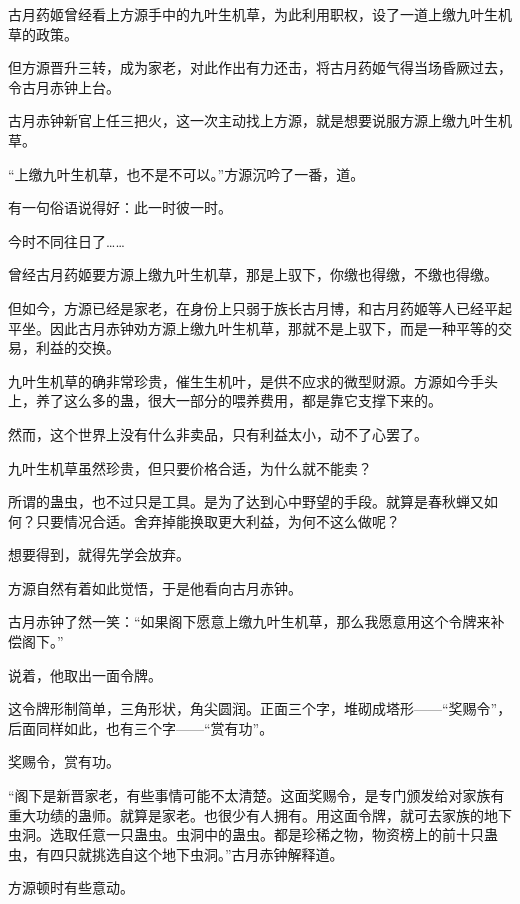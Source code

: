 
\begin{this_body}

古月药姬曾经看上方源手中的九叶生机草，为此利用职权，设了一道上缴九叶生机草的政策。

但方源晋升三转，成为家老，对此作出有力还击，将古月药姬气得当场昏厥过去，令古月赤钟上台。

古月赤钟新官上任三把火，这一次主动找上方源，就是想要说服方源上缴九叶生机草。

“上缴九叶生机草，也不是不可以。”方源沉吟了一番，道。

有一句俗语说得好：此一时彼一时。

今时不同往日了……

曾经古月药姬要方源上缴九叶生机草，那是上驭下，你缴也得缴，不缴也得缴。

但如今，方源已经是家老，在身份上只弱于族长古月博，和古月药姬等人已经平起平坐。因此古月赤钟劝方源上缴九叶生机草，那就不是上驭下，而是一种平等的交易，利益的交换。

九叶生机草的确非常珍贵，催生生机叶，是供不应求的微型财源。方源如今手头上，养了这么多的蛊，很大一部分的喂养费用，都是靠它支撑下来的。

然而，这个世界上没有什么非卖品，只有利益太小，动不了心罢了。

九叶生机草虽然珍贵，但只要价格合适，为什么就不能卖？

所谓的蛊虫，也不过只是工具。是为了达到心中野望的手段。就算是春秋蝉又如何？只要情况合适。舍弃掉能换取更大利益，为何不这么做呢？

想要得到，就得先学会放弃。

方源自然有着如此觉悟，于是他看向古月赤钟。

古月赤钟了然一笑：“如果阁下愿意上缴九叶生机草，那么我愿意用这个令牌来补偿阁下。”

说着，他取出一面令牌。

这令牌形制简单，三角形状，角尖圆润。正面三个字，堆砌成塔形——“奖赐令”，后面同样如此，也有三个字——“赏有功”。

奖赐令，赏有功。

“阁下是新晋家老，有些事情可能不太清楚。这面奖赐令，是专门颁发给对家族有重大功绩的蛊师。就算是家老。也很少有人拥有。用这面令牌，就可去家族的地下虫洞。选取任意一只蛊虫。虫洞中的蛊虫。都是珍稀之物，物资榜上的前十只蛊虫，有四只就挑选自这个地下虫洞。”古月赤钟解释道。

方源顿时有些意动。


\end{this_body}
